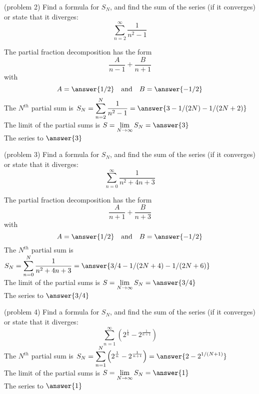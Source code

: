 \documentclass[handout]{ximera}
\begin{document}
\begin{problem}(problem 2)
Find a formula for $S_N$, and find the sum of the series (if it converges) or state that it diverges:
\[
\sum_{n=2}^\infty \frac{1}{n^2 - 1}    
\]

The partial fraction decomposition has the form
\[
\frac{A}{n-1} + \frac{B}{n+1}
\]
with 
\[
A = \answer{1/2} \quad \mbox{and} \quad B = \answer{-1/2}
\]
The $N^{th}$ partial sum is  $\displaystyle S_N = \sum_{n=2}^N \frac{1}{n^2 - 1} =  \answer{3 - 1/(2N) - 1/(2N+2)}$\\
The limit of the partial sums is $\displaystyle S = \lim_{N\to \infty}S_N = \answer{3}$\\
The series  to $\answer{3}$

\end{problem}

\begin{problem}(problem 3)
Find a formula for $S_N$, and find the sum of the series (if it converges) or state that it diverges:
\[
\sum_{n=0}^\infty \frac{1}{n^2 + 4n + 3}    
\]

The partial fraction decomposition has the form
\[
\frac{A}{n+1} + \frac{B}{n+3}
\]
with 
\[
A = \answer{1/2} \quad \mbox{and} \quad B = \answer{-1/2}
\]
The $N^{th}$ partial sum is  $\displaystyle S_N = \sum_{n=0}^N \frac{1}{n^2 + 4n + 3} =  \answer{3/4 -  1/(2N+4)-  1/(2N+6)}$\\
The limit of the partial sums is $\displaystyle S = \lim_{N\to \infty}S_N = \answer{3/4}$\\
The series  to $\answer{3/4}$

\end{problem}


\begin{problem}(problem 4)
Find a formula for $S_N$, and find the sum of the series (if it converges) or state that it diverges:
\[
\sum_{n=1}^\infty \left( 2^{\frac{1}{n}} - 2^{\frac{1}{n+1}}\right) 
\]
The $N^{th}$ partial sum is  $\displaystyle S_N = \sum_{n=1}^N \left( 2^{\frac{1}{n}} - 2^{\frac{1}{n+1}}\right) =  \answer{2 - 2^{1/(N+1)}}$\\
The limit of the partial sums is $\displaystyle S = \lim_{N\to \infty}S_N = \answer{1}$\\
The series  to $\answer{1}$

\end{problem}
\end{document}
